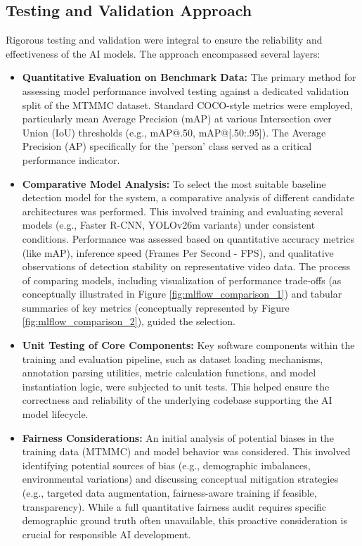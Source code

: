 \subsection{Testing and Validation Approach}
\label{subsection:model_test_validate_new}
Rigorous testing and validation were integral to ensure the reliability and effectiveness of the AI models. The approach encompassed several layers:
\begin{itemize}
    \item \textbf{Quantitative Evaluation on Benchmark Data:} The primary method for assessing model performance involved testing against a dedicated validation split of the MTMMC dataset. Standard COCO-style metrics were employed, particularly mean Average Precision (mAP) at various Intersection over Union (IoU) thresholds (e.g., mAP@.50, mAP@[.50:.95]). The Average Precision (AP) specifically for the 'person' class served as a critical performance indicator.
    \item \textbf{Comparative Model Analysis:} To select the most suitable baseline detection model for the system, a comparative analysis of different candidate architectures was performed. This involved training and evaluating several models (e.g., Faster R-CNN, YOLOv26m variants) under consistent conditions. Performance was assessed based on quantitative accuracy metrics (like mAP), inference speed (Frames Per Second - FPS), and qualitative observations of detection stability on representative video data. The process of comparing models, including visualization of performance trade-offs (as conceptually illustrated in Figure \ref{fig:mlflow_comparison_1}) and tabular summaries of key metrics (conceptually represented by Figure \ref{fig:mlflow_comparison_2}), guided the selection.
    \item \textbf{Unit Testing of Core Components:} Key software components within the training and evaluation pipeline, such as dataset loading mechanisms, annotation parsing utilities, metric calculation functions, and model instantiation logic, were subjected to unit tests. This helped ensure the correctness and reliability of the underlying codebase supporting the AI model lifecycle.
    \item \textbf{Fairness Considerations:} An initial analysis of potential biases in the training data (MTMMC) and model behavior was considered. This involved identifying potential sources of bias (e.g., demographic imbalances, environmental variations) and discussing conceptual mitigation strategies (e.g., targeted data augmentation, fairness-aware training if feasible, transparency). While a full quantitative fairness audit requires specific demographic ground truth often unavailable, this proactive consideration is crucial for responsible AI development.
\end{itemize}

